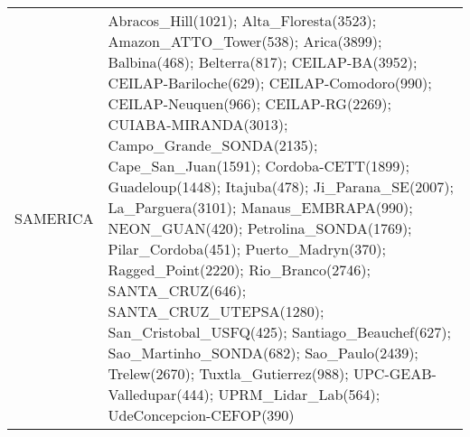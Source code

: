 \documentclass[journal abbreviation, manuscript]{copernicus}
\begin{document}
\begin{table}
\begin{tabularx}{\textwidth}{lX}
  SAMERICA &                                                                                                                                                                                                                                                                                                                                                                                                                                                                                                                                                                                                                                                                                                                                                                                                                                                                                                                                                                                                                                                                                                                                                                                                                                                                                                                                                                                                                                                                                                                                                                                                          Abracos\_Hill(1021); Alta\_Floresta(3523); Amazon\_ATTO\_Tower(538); Arica(3899); Balbina(468); Belterra(817); CEILAP-BA(3952); CEILAP-Bariloche(629); CEILAP-Comodoro(990); CEILAP-Neuquen(966); CEILAP-RG(2269); CUIABA-MIRANDA(3013); Campo\_Grande\_SONDA(2135); Cape\_San\_Juan(1591); Cordoba-CETT(1899); Guadeloup(1448); Itajuba(478); Ji\_Parana\_SE(2007); La\_Parguera(3101); Manaus\_EMBRAPA(990); NEON\_GUAN(420); Petrolina\_SONDA(1769); Pilar\_Cordoba(451); Puerto\_Madryn(370); Ragged\_Point(2220); Rio\_Branco(2746); SANTA\_CRUZ(646); SANTA\_CRUZ\_UTEPSA(1280); San\_Cristobal\_USFQ(425); Santiago\_Beauchef(627); Sao\_Martinho\_SONDA(682); Sao\_Paulo(2439); Trelew(2670); Tuxtla\_Gutierrez(988); UPC-GEAB-Valledupar(444); UPRM\_Lidar\_Lab(564); UdeConcepcion-CEFOP(390) \\

\end{tabularx}
\end{table}
\end{document}
